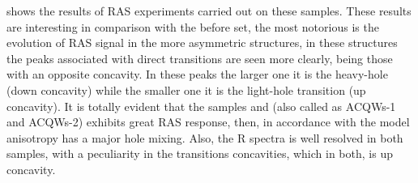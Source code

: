  shows the results of \gls{RAS} experiments carried out on these samples. These results are interesting in comparison with the before set,  the most notorious is the evolution of \gls{RAS} signal in the more asymmetric structures, in these structures the peaks associated with direct transitions are seen more clearly, being those with an opposite concavity. In these peaks the larger one it is the heavy-hole (down concavity) while the  smaller one it is the light-hole transition (up concavity). It is totally evident that the samples  and  (also called as ACQWs-1 and ACQWs-2) exhibits great \gls{RAS} response, then, in  accordance with the model anisotropy  has a major hole mixing.  Also, the \gls{R} spectra is well resolved in both samples, with a peculiarity in the transitions concavities, which in both, is up concavity. 
